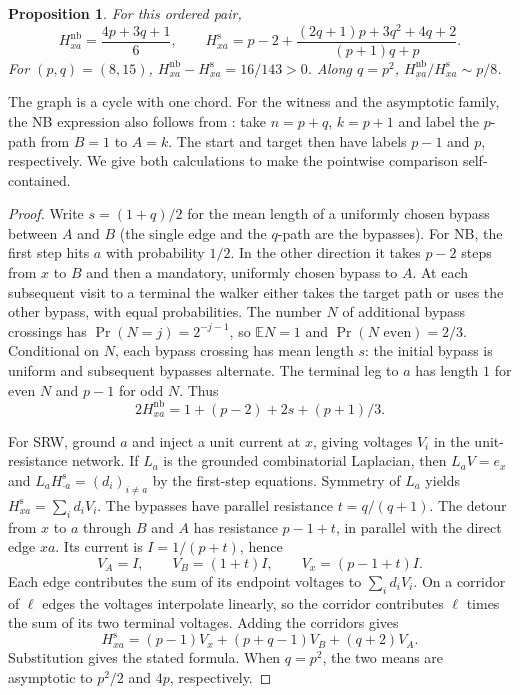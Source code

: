\documentclass[11pt]{article}
\newtheorem{proposition}[theorem]{Proposition}
\newcommand{\nb}{\mathrm{nb}}
\newcommand{\sr}{\mathrm{s}}
\newcommand{\E}{\mathbb E}
\begin{document}
\begin{proposition}\label{prop:theta}
For this ordered pair,
\[
 H^\nb_{xa}=\frac{4p+3q+1}{6},\qquad
 H^\sr_{xa}=p-2+\frac{(2q+1)p+3q^2+4q+2}{(p+1)q+p}.
\]
For $(p,q)=(8,15)$, $H^\nb_{xa}-H^\sr_{xa}=16/143>0$.
Along $q=p^2$, $H^\nb_{xa}/H^\sr_{xa}\sim p/8$.
\end{proposition}
The graph is a cycle with one chord. For the witness and the asymptotic
family, the NB expression also follows from \cite[App.~A.1, case~(2)]{BKKS}:
take $n=p+q$, $k=p+1$ and label the $p$-path from $B=1$ to $A=k$.
The start and target then have labels $p-1$ and $p$, respectively.
We give both calculations to make the pointwise comparison self-contained.

\begin{proof}
Write $s=(1+q)/2$ for the mean length of a uniformly chosen bypass between
$A$ and $B$ (the single edge and the $q$-path are the bypasses).
For NB, the first step hits $a$ with probability $1/2$. In the other
direction it takes $p-2$ steps from $x$ to $B$ and then a mandatory,
uniformly chosen bypass to $A$. At each subsequent visit to a terminal
the walker either takes the target path or uses the other bypass, with
equal probabilities. The number $N$ of additional bypass crossings has
$\Pr(N=j)=2^{-j-1}$, so $\E N=1$ and $\Pr(N\text{ even})=2/3$.
Conditional on $N$, each bypass crossing has mean length $s$: the
initial bypass is uniform and subsequent bypasses alternate. The terminal
leg to $a$ has length $1$ for even $N$ and $p-1$ for odd $N$. Thus
\[
 2H^\nb_{xa}=1+(p-2)+2s+(p+1)/3 .
\]

For SRW, ground $a$ and inject a unit current at $x$, giving voltages
$V_i$ in the unit-resistance network. If $L_a$ is the grounded
combinatorial Laplacian, then $L_a V=e_x$ and
$L_a H^\sr_{\cdot a}=(d_i)_{i\ne a}$ by the first-step equations.
Symmetry of $L_a$ yields $H^\sr_{xa}=\sum_i d_i V_i$.
The bypasses have parallel resistance $t=q/(q+1)$. The detour from
$x$ to $a$ through $B$ and $A$ has resistance $p-1+t$, in parallel
with the direct edge $xa$. Its current is $I=1/(p+t)$, hence
\[
 V_A=I,\qquad V_B=(1+t)I,\qquad V_x=(p-1+t)I .
\]
Each edge contributes the sum of its endpoint voltages to $\sum_i d_iV_i$.
On a corridor of $\ell$ edges the voltages interpolate linearly, so the
corridor contributes $\ell$ times the sum of its two terminal voltages.
Adding the corridors gives
\[
 H^\sr_{xa}=(p-1)V_x+(p+q-1)V_B+(q+2)V_A.
\]
Substitution gives the stated formula. When $q=p^2$, the two means are
asymptotic to $p^2/2$ and $4p$, respectively.
\end{proof}
\end{document}
